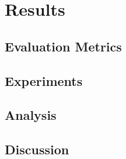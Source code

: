 
\chapter{Results}  \label{sec:results}

\section{Evaluation Metrics}  \label{sec:metrics}

\section{Experiments}  \label{sec:experiments}

\section{Analysis}  \label{sec:analysis}

\section{Discussion}  \label{sec:discussion}

